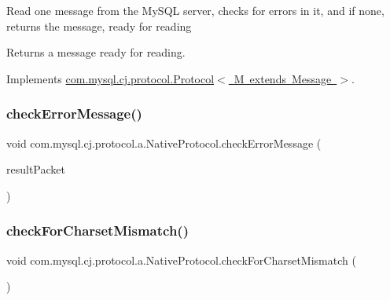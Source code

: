 Read one message from the My\+S\+QL server, checks for errors in it, and if none, returns the message, ready for reading

\begin{DoxyReturn}{Returns}
a message ready for reading. 
\end{DoxyReturn}


Implements \mbox{\hyperlink{interfacecom_1_1mysql_1_1cj_1_1protocol_1_1_protocol_a7176330712bc7aa3ba67261d4a8ef0ca}{com.\+mysql.\+cj.\+protocol.\+Protocol$<$ M extends Message $>$}}.

\mbox{\label{classcom_1_1mysql_1_1cj_1_1protocol_1_1a_1_1_native_protocol_a51128705ba4a4490581947a160c3137c}} 
\subsubsection{\texorpdfstring{check\+Error\+Message()}{checkErrorMessage()}\hspace{0.1cm}{\footnotesize\ttfamily [2/2]}}
{\footnotesize\ttfamily void com.\+mysql.\+cj.\+protocol.\+a.\+Native\+Protocol.\+check\+Error\+Message (\begin{DoxyParamCaption}\item[{\mbox{\hyperlink{classcom_1_1mysql_1_1cj_1_1protocol_1_1a_1_1_native_packet_payload}{Native\+Packet\+Payload}}}]{result\+Packet }\end{DoxyParamCaption})}

\mbox{\label{classcom_1_1mysql_1_1cj_1_1protocol_1_1a_1_1_native_protocol_a08c79e079662813e512c6fe30cfb5fdd}} 
\subsubsection{\texorpdfstring{check\+For\+Charset\+Mismatch()}{checkForCharsetMismatch()}}
{\footnotesize\ttfamily void com.\+mysql.\+cj.\+protocol.\+a.\+Native\+Protocol.\+check\+For\+Charset\+Mismatch (\begin{DoxyParamCaption}{ }\end{DoxyParamCaption})}

